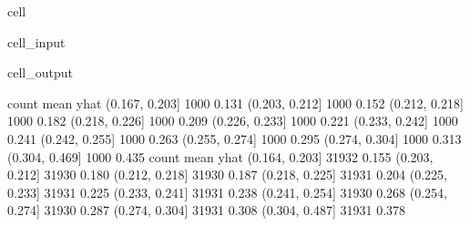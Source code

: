 \documentclass[letterpaper,10pt,english]{jupyterBook}
\begin{document}
\begin{sphinxuseclass}{cell}\begin{sphinxVerbatimInput}

\begin{sphinxuseclass}{cell_input}
\begin{sphinxVerbatim}[commandchars=\\\{\}]
 
 
\end{sphinxVerbatim}

\end{sphinxuseclass}\end{sphinxVerbatimInput}
\begin{sphinxVerbatimOutput}

\begin{sphinxuseclass}{cell_output}
\begin{sphinxVerbatim}[commandchars=\\\{\}]
                count  mean
yhat                       
(0.167, 0.203]   1000 0.131
(0.203, 0.212]   1000 0.152
(0.212, 0.218]   1000 0.182
(0.218, 0.226]   1000 0.209
(0.226, 0.233]   1000 0.221
(0.233, 0.242]   1000 0.241
(0.242, 0.255]   1000 0.263
(0.255, 0.274]   1000 0.295
(0.274, 0.304]   1000 0.313
(0.304, 0.469]   1000 0.435
                count  mean
yhat                       
(0.164, 0.203]  31932 0.155
(0.203, 0.212]  31930 0.180
(0.212, 0.218]  31930 0.187
(0.218, 0.225]  31931 0.204
(0.225, 0.233]  31931 0.225
(0.233, 0.241]  31931 0.238
(0.241, 0.254]  31930 0.268
(0.254, 0.274]  31930 0.287
(0.274, 0.304]  31931 0.308
(0.304, 0.487]  31931 0.378
\end{sphinxVerbatim}

\noindent{}

\end{sphinxuseclass}\end{sphinxVerbatimOutput}

\end{sphinxuseclass}
\end{document}
